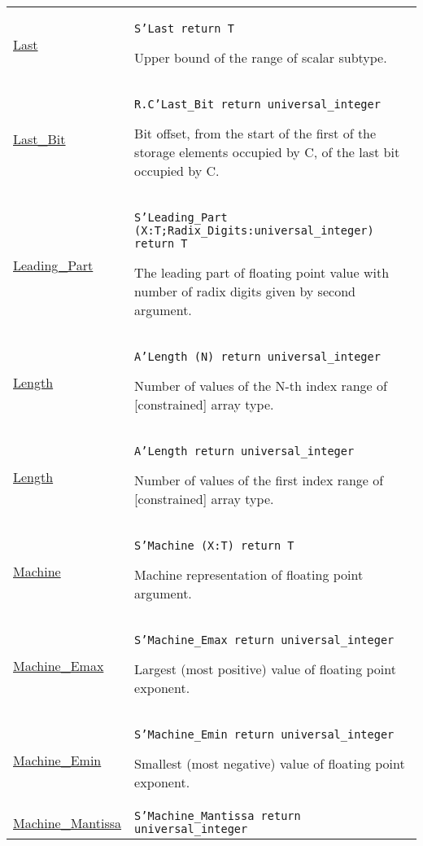 \documentclass[english]{article}
\begin{document}
\begin{scriptsize}
\begin{multicols*}{3}
\begin{tabular}{@{}p{2cm}p{6.5cm}}
   \href{http://www.ada-auth.org/standards/22rm/html/RM-K-2.html}{Last} & \texttt{S'Last return T}

   Upper bound of the range of scalar subtype.\\

   \href{http://www.ada-auth.org/standards/22rm/html/RM-K-2.html}{Last\_Bit} & \texttt{R.C'Last\_Bit return universal\_integer}

   Bit offset, from the start of the first of the storage elements occupied by C, of the last bit occupied by C.\\

   \href{http://www.ada-auth.org/standards/22rm/html/RM-K-2.html}{Leading\_Part} & \texttt{S'Leading\_Part (X:T;Radix\_Digits:universal\_integer) return T}

   The leading part of floating point value with number of radix digits given by second argument.\\

   \href{http://www.ada-auth.org/standards/22rm/html/RM-K-2.html}{Length} & \texttt{A'Length (N) return universal\_integer}

   Number of values of the N-th index range of [constrained] array type.\\

   \href{http://www.ada-auth.org/standards/22rm/html/RM-K-2.html}{Length} & \texttt{A'Length return universal\_integer}

   Number of values of the first index range of [constrained] array type.\\

   \href{http://www.ada-auth.org/standards/22rm/html/RM-K-2.html}{Machine} & \texttt{S'Machine (X:T) return T}

   Machine representation of floating point argument.\\

   \href{http://www.ada-auth.org/standards/22rm/html/RM-K-2.html}{Machine\_Emax} & \texttt{S'Machine\_Emax return universal\_integer}

   Largest (most positive) value of floating point exponent.\\

   \href{http://www.ada-auth.org/standards/22rm/html/RM-K-2.html}{Machine\_Emin} & \texttt{S'Machine\_Emin return universal\_integer}

   Smallest (most negative) value of floating point exponent.\\

   \href{http://www.ada-auth.org/standards/22rm/html/RM-K-2.html}{Machine\_Mantissa} & \texttt{S'Machine\_Mantissa return universal\_integer}


\end{tabular}
\end{multicols*}
\end{scriptsize}
\end{document}

